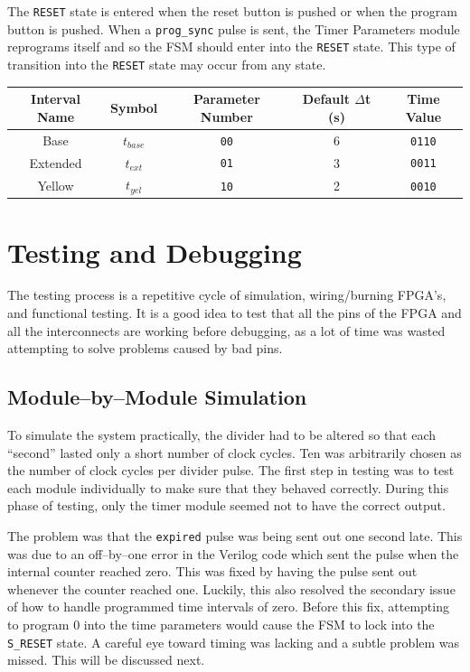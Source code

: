 \documentclass[11]{article}
\begin{document}
	The \texttt{RESET} state is entered when the reset button is pushed or
	when the program button is pushed.
	When a \texttt{prog\_sync} pulse is sent, the Timer Parameters module
	reprograms itself and so the FSM should enter into the \texttt{RESET}
	state.  This type of transition into the \texttt{RESET} state may occur
	from any state.
	
	\begin{table}
	\centering
		\begin{tabular}{|c|c|c|c|c|}
		\hline
		Interval Name & Symbol & Parameter Number & Default $\Delta$t (s) & Time Value \\ \hline
		Base & $t_{base}$ & \texttt{00} & 6 & \texttt{0110} \\ \hline
		Extended & $t_{ext}$ & \texttt{01} & 3 & \texttt{0011} \\ \hline
		Yellow & $t_{yel}$ & \texttt{10} & 2 & \texttt{0010} \\ \hline
		\end{tabular}
	\label{tbl:timeparam}
	\end{table}


\section{Testing and Debugging}
	The testing process is a repetitive cycle of simulation, wiring/burning
	FPGA's, and functional testing.  It is a good idea to test that all the
	pins of the FPGA and all the interconnects are working before debugging, as
	a lot of time was wasted attempting to solve problems caused by bad pins.

	\subsection{Module--by--Module Simulation}
	To simulate the system practically, the divider had to be altered so
	that each ``second'' lasted only a short number of clock cycles.  Ten
	was arbitrarily chosen as the number of clock cycles per divider pulse.
	The first step in testing was to test each module individually to make
	sure that they behaved correctly.  During this phase of testing, only
	the timer module seemed not to have the correct output.
	
	The problem was that the \texttt{expired} pulse was being sent out one
	second late.  This was due to an off--by--one error in the Verilog code
	which sent the pulse when the internal counter reached zero.  This was
	fixed by having the pulse sent out whenever the counter reached one.
	Luckily, this also resolved the secondary issue of how to handle programmed
	time intervals of zero.  Before this fix, attempting to program 0 into the
	time parameters would cause the FSM to lock into the \texttt{S\_RESET}
	state.  A careful eye toward timing was lacking and a subtle problem was
	missed.  This will be discussed next.
\end{document}
